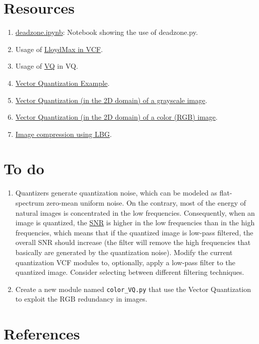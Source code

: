 \section*{Resources}

\begin{enumerate}
\item \href{https://github.com/Sistemas-Multimedia/VCF/blob/main/notebooks/deadzone.ipynb}{deadzone.ipynb}: Notebook showing the use of deadzone.py.
\item Usage of \href{https://github.com/Sistemas-Multimedia/VCF/blob/main/notebooks/LloydMax.ipynb}{LloydMax in VCF}.
  \item Usage of \href{https://github.com/Sistemas-Multimedia/VCF/blob/main/notebooks/VQ.ipynb}{VQ} in VQ.
\item
  \href{https://scikit-learn.org/stable/auto_examples/cluster/plot_face_compress.html#sphx-glr-auto-examples-cluster-plot-face-compress-py}{Vector
    Quantization Example}.
\item
  \href{https://github.com/vicente-gonzalez-ruiz/vector_quantization/blob/main/docs/gray_VQ.ipynb}{Vector
    Quantization (in the 2D domain) of a grayscale image}.
\item
  \href{https://github.com/vicente-gonzalez-ruiz/vector_quantization/blob/main/docs/spatial_color_VQ.ipynb}{Vector
    Quantization (in the 2D domain) of a color (RGB) image}.
  \item \href{https://github.com/droidadroit/LBG}{Image compression using LBG}.
\end{enumerate}

\section*{To do}
\begin{enumerate}
\item Quantizers generate quantization noise, which can be modeled as
  flat-spectrum zero-mean uniform noise. On the contrary, most of the
  energy of natural images is concentrated in the low
  frequencies. Consequently, when an image is quantized, the
  \href{https://en.wikipedia.org/wiki/Signal-to-noise_ratio}{SNR} is
  higher in the low frequencies than in the high frequencies, which
  means that if the quantized image is low-pass filtered, the overall
  SNR should increase (the filter will remove the high frequencies
  that basically are generated by the quantization noise). Modify the
  current quantization VCF modules to, optionally, apply a low-pass
  filter to the quantized image. Consider selecting between different
  filtering techniques.

\item Create a new module named \texttt{color\_VQ.py} that use the
  Vector Quantization to exploit the $\text{RGB}$ redundancy in images.
\end{enumerate}

\section{References}

\renewcommand{\addcontentsline}[3]{}%

